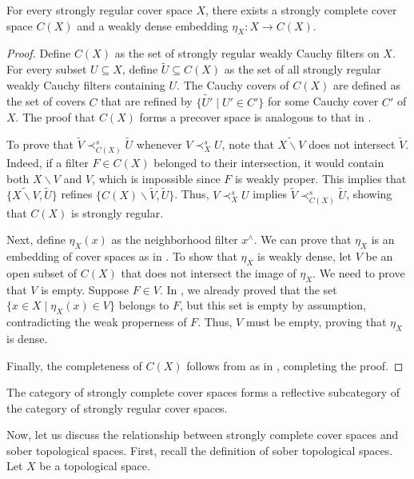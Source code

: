\documentclass[reqno]{amsart}
\theoremstyle{definition}
\theoremstyle{remark}
\numberwithin{figure}{section}
\newcommand{\rb}{\prec}
\begin{document}
\begin{thm}
For every strongly regular cover space $X$, there exists a strongly complete cover space $C(X)$ and a weakly dense embedding $\eta_X : X \to C(X)$.
\end{thm}
\begin{proof}
Define $C(X)$ as the set of strongly regular weakly Cauchy filters on $X$.  
For every subset $U \subseteq X$, define $\widetilde{U} \subseteq C(X)$ as the set of all strongly regular weakly Cauchy filters containing $U$.  
The Cauchy covers of $C(X)$ are defined as the set of covers $C$ that are refined by $\{ \widetilde{U'} \mid U' \in C' \}$ for some Cauchy cover $C'$ of $X$.  
The proof that $C(X)$ forms a precover space is analogous to that in .

To prove that $\widetilde{V} \rb^s_{C(X)} \widetilde{U}$ whenever $V \rb^s_X U$, note that $\widetilde{X \backslash V}$ does not intersect $\widetilde{V}$.  
Indeed, if a filter $F \in C(X)$ belonged to their intersection, it would contain both $X \backslash V$ and $V$, which is impossible since $F$ is weakly proper.  
This implies that $\{ \widetilde{X \backslash V}, \widetilde{U} \}$ refines $\{ C(X) \backslash \widetilde{V}, \widetilde{U} \}$.  
Thus, $V \rb^s_X U$ implies $\widetilde{V} \rb^s_{C(X)} \widetilde{U}$, showing that $C(X)$ is strongly regular.

Next, define $\eta_X(x)$ as the neighborhood filter $x^\wedge$.  
We can prove that $\eta_X$ is an embedding of cover spaces as in .  
To show that $\eta_X$ is weakly dense, let $V$ be an open subset of $C(X)$ that does not intersect the image of $\eta_X$.  
We need to prove that $V$ is empty.  
Suppose $F \in V$.  
In , we already proved that the set $\{ x \in X \mid \eta_X(x) \in V \}$ belongs to $F$, but this set is empty by assumption, contradicting the weak properness of $F$.
Thus, $V$ must be empty, proving that $\eta_X$ is dense.

Finally, the completeness of $C(X)$ follows from  as in , completing the proof.
\end{proof}

\begin{cor}
The category of strongly complete cover spaces forms a reflective subcategory of the category of strongly regular cover spaces.
\end{cor}

Now, let us discuss the relationship between strongly complete cover spaces and sober topological spaces.
First, recall the definition of sober topological spaces.
Let $X$ be a topological space.  
\end{document}
